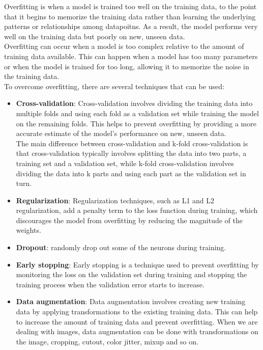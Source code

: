 \documentclass{article}
\begin{document}
Overfitting is when a model is trained too well on the training data, to the point that it begins to memorize the training data rather than learning the underlying patterns or relationships among datapoitns. As a result, the model performs very well on the training data but poorly on new, unseen data. \\

Overfitting can occur when a model is too complex relative to the amount of training data available. This can happen when a model has too many parameters or when the model is trained for too long, allowing it to memorize the noise in the training data. \\

To overcome overfitting, there are several techniques that can be used:

\begin{itemize}
    \item \textbf{Cross-validation}: Cross-validation involves dividing the training data into multiple folds and using each fold as a validation set while training the model on the remaining folds. This helps to prevent overfitting by providing a more accurate estimate of the model's performance on new, unseen data. \\ 
    
    The main difference between cross-validation and k-fold cross-validation is that cross-validation typically involves splitting the data into two parts, a training set and a validation set, while k-fold cross-validation involves dividing the data into k parts and using each part as the validation set in turn.
    
    \item \textbf{Regularization}: Regularization techniques, such as L1 and L2 regularization, add a penalty term to the loss function during training, which discourages the model from overfitting by reducing the magnitude of the weights.
    
    \item \textbf{Dropout}: randomly drop out some of the neurons during training.
    
    \item \textbf{Early stopping}: Early stopping is a technique used to prevent overfitting by monitoring the loss on the validation set during training and stopping the training process when the validation error starts to increase.
    
    \item \textbf{Data augmentation}: Data augmentation involves creating new training data by applying transformations to the existing training data. This can help to increase the amount of training data and prevent overfitting. When we are dealing with images, data augmentation can be done with transformations on the image, cropping, cutout, color jitter, mixup and so on.
\end{itemize}
\end{document}
